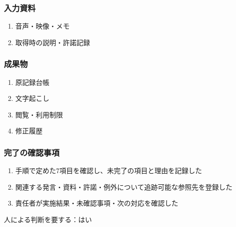 \documentclass[a4paper,11pt]{article}
\begin{document}
\subsubsection*{入力資料}
\begin{enumerate}[leftmargin=2em,itemsep=0.35em]
\item 音声・映像・メモ
\item 取得時の説明・許諾記録
\end{enumerate}
\subsubsection*{成果物}
\begin{enumerate}[leftmargin=2em,itemsep=0.35em]
\item 原記録台帳
\item 文字起こし
\item 閲覧・利用制限
\item 修正履歴
\end{enumerate}
\subsubsection*{完了の確認事項}
\begin{enumerate}[leftmargin=2em,itemsep=0.35em]
\item 手順で定めた7項目を確認し、未完了の項目と理由を記録した
\item 関連する発言・資料・許諾・例外について追跡可能な参照先を登録した
\item 責任者が実施結果・未確認事項・次の対応を確認した
\end{enumerate}
\par 人による判断を要する：はい\par\medskip
\end{document}
